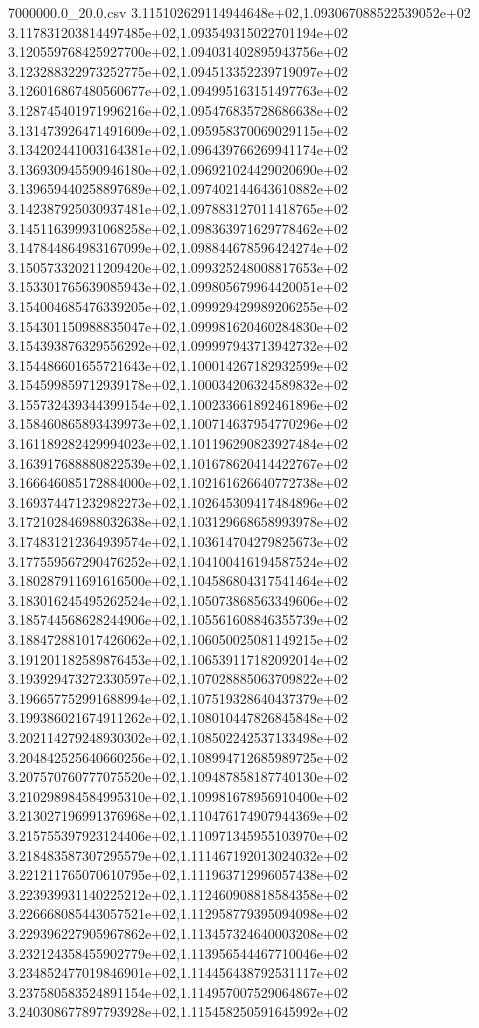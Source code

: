 \begin{filecontents*}{7000000.0_20.0.csv}
3.115102629114944648e+02,1.093067088522539052e+02
3.117831203814497485e+02,1.093549315022701194e+02
3.120559768425927700e+02,1.094031402895943756e+02
3.123288322973252775e+02,1.094513352239719097e+02
3.126016867480560677e+02,1.094995163151497763e+02
3.128745401971996216e+02,1.095476835728686638e+02
3.131473926471491609e+02,1.095958370069029115e+02
3.134202441003164381e+02,1.096439766269941174e+02
3.136930945590946180e+02,1.096921024429020690e+02
3.139659440258897689e+02,1.097402144643610882e+02
3.142387925030937481e+02,1.097883127011418765e+02
3.145116399931068258e+02,1.098363971629778462e+02
3.147844864983167099e+02,1.098844678596424274e+02
3.150573320211209420e+02,1.099325248008817653e+02
3.153301765639085943e+02,1.099805679964420051e+02
3.154004685476339205e+02,1.099929429989206255e+02
3.154301150988835047e+02,1.099981620460284830e+02
3.154393876329556292e+02,1.099997943713942732e+02
3.154486601655721643e+02,1.100014267182932599e+02
3.154599859712939178e+02,1.100034206324589832e+02
3.155732439344399154e+02,1.100233661892461896e+02
3.158460865893439973e+02,1.100714637954770296e+02
3.161189282429994023e+02,1.101196290823927484e+02
3.163917688880822539e+02,1.101678620414422767e+02
3.166646085172884000e+02,1.102161626640772738e+02
3.169374471232982273e+02,1.102645309417484896e+02
3.172102846988032638e+02,1.103129668658993978e+02
3.174831212364939574e+02,1.103614704279825673e+02
3.177559567290476252e+02,1.104100416194587524e+02
3.180287911691616500e+02,1.104586804317541464e+02
3.183016245495262524e+02,1.105073868563349606e+02
3.185744568628244906e+02,1.105561608846355739e+02
3.188472881017426062e+02,1.106050025081149215e+02
3.191201182589876453e+02,1.106539117182092014e+02
3.193929473272330597e+02,1.107028885063709822e+02
3.196657752991688994e+02,1.107519328640437379e+02
3.199386021674911262e+02,1.108010447826845848e+02
3.202114279248930302e+02,1.108502242537133498e+02
3.204842525640660256e+02,1.108994712685989725e+02
3.207570760777075520e+02,1.109487858187740130e+02
3.210298984584995310e+02,1.109981678956910400e+02
3.213027196991376968e+02,1.110476174907944369e+02
3.215755397923124406e+02,1.110971345955103970e+02
3.218483587307295579e+02,1.111467192013024032e+02
3.221211765070610795e+02,1.111963712996057438e+02
3.223939931140225212e+02,1.112460908818584358e+02
3.226668085443057521e+02,1.112958779395094098e+02
3.229396227905967862e+02,1.113457324640003208e+02
3.232124358455902779e+02,1.113956544467710046e+02
3.234852477019846901e+02,1.114456438792531117e+02
3.237580583524891154e+02,1.114957007529064867e+02
3.240308677897793928e+02,1.115458250591645992e+02

\end{filecontents*}
